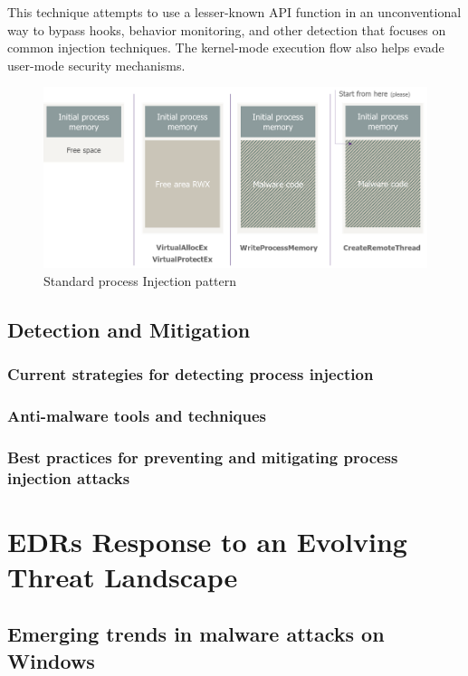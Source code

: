 \documentclass{article}
\newcommand{\outlinecite}[1]{\citetitle{#1} \textcite{#1}}
\begin{document}
This technique attempts to use a lesser-known API function in an unconventional way to bypass hooks, behavior monitoring, and other detection that focuses on common injection techniques. The kernel-mode execution flow also helps evade user-mode security mechanisms.

\begin{figure}[ht]
\includegraphics[scale=0.9]{dequeker_standard_process_injection_pattern.png}
\caption{Standard process Injection pattern \autocite{Dequeker:2023}}
\end{figure}
 

\subsection{Detection and Mitigation}

\subsubsection{Current strategies for detecting process injection}

\subsubsection{Anti-malware tools and techniques}

\subsubsection{Best practices for preventing and mitigating process injection attacks}

\section{EDRs Response to an Evolving Threat Landscape}

\outlinecite{Hayes:2023}

\subsection{Emerging trends in malware attacks on Windows}
\end{document}
